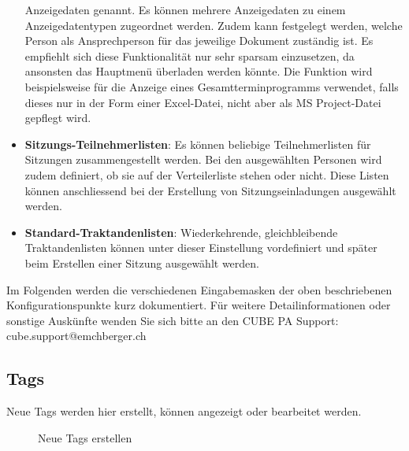 \begin{itemize}
Anzeigedaten genannt. Es können mehrere Anzeigedaten zu einem Anzeigedatentypen zugeordnet werden. Zudem kann festgelegt werden, welche Person als Ansprechperson für das jeweilige Dokument zuständig ist. Es empfiehlt sich diese Funktionalität nur sehr sparsam einzusetzen, da ansonsten das Hauptmenü überladen werden könnte. Die Funktion wird beispielsweise für die Anzeige eines Gesamtterminprogramms verwendet, falls dieses nur in der Form einer Excel-Datei, nicht aber als MS Project-Datei gepflegt wird.
\item
\textbf{Sitzungs-Teilnehmerlisten}: Es können beliebige Teilnehmerlisten für Sitzungen zusammengestellt werden. Bei den ausgewählten Personen wird zudem definiert, ob sie auf der Verteilerliste stehen oder nicht. Diese Listen können anschliessend bei der Erstellung von Sitzungseinladungen ausgewählt werden.
\item
\textbf{Standard-Traktandenlisten}: Wiederkehrende, gleichbleibende Traktandenlisten können unter dieser Einstellung vordefiniert und später beim Erstellen einer Sitzung ausgewählt werden.
\end{itemize}

\vspace{\baselineskip}

Im Folgenden werden die verschiedenen Eingabemasken der oben beschriebenen Konfigurationspunkte kurz dokumentiert. Für weitere Detailinformationen oder sonstige Auskünfte wenden Sie sich bitte an den CUBE PA Support: {\color{red} cube.support@emchberger.ch}

\subsection{Tags}

Neue Tags werden hier erstellt, können angezeigt oder bearbeitet werden.

\begin{figure}[H]
\caption{Neue Tags erstellen}
\end{figure}

